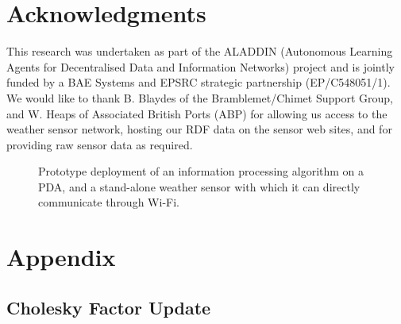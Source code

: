 \documentclass{acmtrans2m}
\begin{document}
\section*{Acknowledgments}

\noindent This research was undertaken as part of the ALADDIN (Autonomous Learning Agents for Decentralised Data and Information Networks) project and is jointly funded by a BAE Systems and EPSRC strategic partnership (EP/C548051/1). We would like to thank B. Blaydes of the Bramblemet/Chimet Support Group, and W. Heaps of Associated British Ports (ABP) for allowing us access to the weather sensor network, hosting our RDF data on the sensor web sites, and for providing raw sensor data as required.

\begin{figure}[tp!]
\begin{center}
\hspace{1.0cm}
\caption{Prototype deployment of an information processing algorithm on a PDA, and a stand-alone weather sensor with which it can directly communicate through Wi-Fi.}
\label{trimble}
\end{center}
\end{figure}
  



\appendix

\section{Appendix} \label{sec:Appendix}

\subsection{Cholesky Factor Update}

\small
\end{document}
